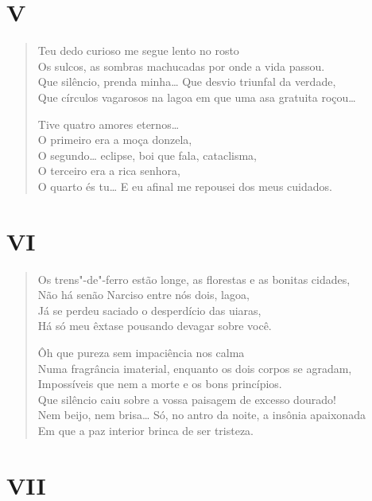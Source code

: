 {\medskip
\section*{V}

\begin{verse}
Teu dedo curioso me segue lento no rosto\\
Os sulcos, as sombras machucadas por onde a vida passou.\\
Que silêncio, prenda minha\ldots{} Que desvio triunfal da verdade,\\
Que círculos vagarosos na lagoa em que uma asa gratuita roçou\ldots{}

Tive quatro amores eternos\ldots{}\\
O primeiro era a moça donzela,\\
O segundo\ldots{} eclipse, boi que fala, cataclisma,\\
O terceiro era a rica senhora,\\
O quarto és tu\ldots{} E eu afinal me repousei dos meus cuidados.
\end{verse}

\medskip
\section*{VI}

\begin{verse}
Os trens"-de"-ferro estão longe, as florestas e as bonitas cidades,\\
Não há senão Narciso entre nós dois, lagoa,\\
Já se perdeu saciado o desperdício das uiaras,\\
Há só meu êxtase pousando devagar sobre você.

Ôh que pureza sem impaciência nos calma\\
Numa fragrância imaterial, enquanto os dois corpos se agradam,\\
Impossíveis que nem a morte e os bons princípios.\\
Que silêncio caiu sobre a vossa paisagem de excesso dourado!\\
Nem beijo, nem brisa\ldots{} Só, no antro da noite, a insônia apaixonada\\
Em que a paz interior brinca de ser tristeza.
\end{verse}

\medskip
\section*{VII}

}
